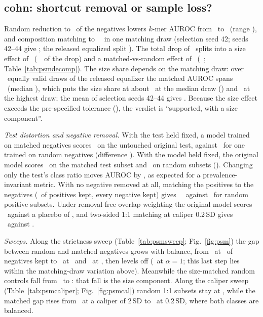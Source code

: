 \documentclass[journal,onecolumn,10pt,letterpaper]{IEEEtran}
\newcommand{\tasku}{\textunderscore\allowbreak}
\DeclareRobustCommand{\task}[1]{{\normalfont\ttfamily\upshape\let\_\tasku #1}}
\begin{document}
\subsection{\texorpdfstring{\task{cohn}}{cohn}: shortcut removal or sample loss?}
Random reduction to \smKeptCohn\ of the negatives lowers $k$-mer AUROC from \smAzero\ to \smAr\ (range
\smArRange), and composition matching to \smAm\ \smAmCI\ in one matching draw (selection seed 42;
seeds 42--44 give \smAmSeeds; the released equalized split \smPub). The total drop of \smDropTotal\ splits into
a size effect of \smSizeEff\ (\smSizeShare\ \smSizeShareCI\ of the drop) and a matched-vs-random effect
of \smMvr\ (\smMvrShare\ \smMvrShareCI; Table~\ref{tab:psmdecomp}). The size share depends on the
matching draw: over \smDraws\ equally valid draws of the released equalizer the matched AUROC spans
\smDrawRange\ (median \smDrawMedian), which puts the size share at about \smSizeShareMedian\ at the
median draw (\smSizeShareMedianExact) and \smSizeShareMax\ at the highest draw; the mean of selection
seeds 42--44 gives \smSizeShareSeeds. Because the size effect exceeds the pre-specified tolerance
(\smTau), the verdict is ``supported, with a size component''.

\emph{Test distortion and negative removal.} With the test held fixed, a model trained on matched
negatives scores \smTrainOnly\ on the untouched original test, against \smTrainOnlyR\ for one trained on
random negatives (difference \smTrainOnlyD). With the model held fixed, the original model scores
\smFixed\ on the matched test subset and \smFixedR\ on random subsets (\smFixedD). Changing only the
test's class ratio moves AUROC by \smRatioOnly, as expected for a prevalence-invariant metric. With no
negative removed at all, matching the positives to the negatives (\smFfourPos\ of positives kept,
every negative kept) gives \smFfour\ \smFfourCI\ against \smFfourR\ for random positive subsets. Under
removal-free overlap weighting the original model scores \smOverlapFixed\ against a placebo of
\smOverlapPlacebo, and two-sided 1:1 matching at caliper 0.2\,SD gives \smOneToOne\ against \smOneToOneR.

\emph{Sweeps.} Along the strictness sweep (Table~\ref{tab:psmsweep}; Fig.~\ref{fig:psm}) the gap
between random and matched negatives grows with balance, from \smSweepGapLoose\ at \smSweepKeptLoose\
of negatives kept to \smSweepGapHalf\ at \smSweepKeptHalf\ and \smSweepGapNine\ at \smSweepKeptNine,
then levels off (\smSweepGapOne\ at $\alpha{=}1$; this last step lies within the
matching-draw variation above). Meanwhile the size-matched random controls fall from
\smSweepRandLoose\ to \smSweepRandOne: that fall is the size component. Along the caliper sweep
(Table~\ref{tab:psmcaliper}; Fig.~\ref{fig:psmcal}) random 1:1 subsets stay at \smCalRandRange, while
the matched gap rises from \smCalGapTwo\ at a caliper of 2\,SD to \smCalGapPtTwo\ at 0.2\,SD, where both
classes are balanced.
\end{document}
